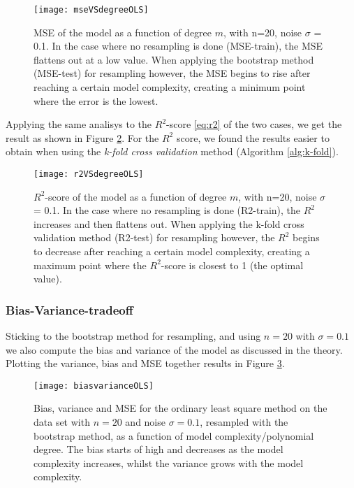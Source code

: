 \begin{figure}[htbp]
	\centering
	\texttt{[image: mseVSdegreeOLS]}
	\caption{MSE of the model as a function of degree $m$, with n=20, noise $\sigma$ = 0.1. In the case where no resampling is done (MSE-train), the MSE flattens out at a low value. When applying the bootstrap method (MSE-test) for resampling however, the MSE begins to rise after reaching a certain model complexity, creating a minimum point where the error is the lowest.}
	\label{fig:mseVSdegreeOLS}
\end{figure}

Applying the same analisys to the $R^2$-score \eqref{eq:r2} of the two cases, we get the result as shown in Figure \ref{fig:r2VSdegreeOLS}. For the $R^2$ score, we found the results easier to obtain when using the \emph{k-fold cross validation} method (Algorithm \ref{alg:k-fold}).
\begin{figure}[htbp]
	\centering
	\texttt{[image: r2VSdegreeOLS]}
	\caption{$R^2$-score of the model as a function of degree $m$, with n=20, noise $\sigma$ = 0.1. In the case where no resampling is done (R2-train), the $R^2$ increases and then flattens out. When applying the k-fold cross validation method (R2-test) for resampling however, the $R^2$ begins to decrease after reaching a certain model complexity, creating a maximum point where the $R^2$-score is closest to 1 (the optimal value).}
	\label{fig:r2VSdegreeOLS}
\end{figure}

\subsubsection{Bias-Variance-tradeoff}
Sticking to the bootstrap method for resampling, and using $n=20$ with $\sigma = 0.1$ we also compute the bias and variance of the model as discussed in the theory. Plotting the variance, bias and MSE together results in Figure \ref{fig:biasvarianceOLS}.

\begin{figure}[htbp]
	\centering
	\texttt{[image: biasvarianceOLS]}
	\caption{Bias, variance and MSE for the ordinary least square method on the data set with $n=20$ and noise $\sigma=0.1$, resampled with the bootstrap method, as a function of model complexity/polynomial degree. The bias starts of high and decreases as the model complexity increases, whilst the variance grows with the model complexity.}
	\label{fig:biasvarianceOLS}
\end{figure}

